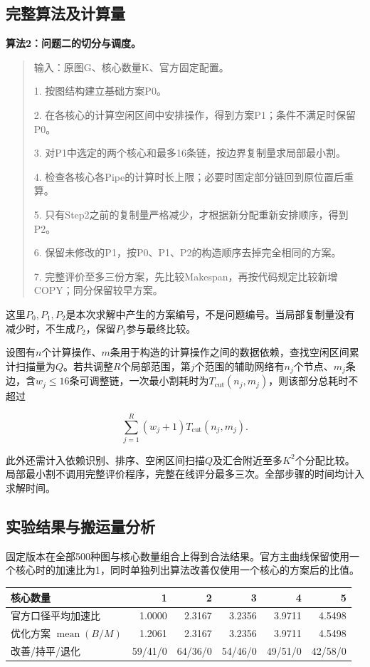 \documentclass[anonymous,notoc]{gmcm2026}
\begin{document}
\subsection{完整算法及计算量}

\textbf{算法2：问题二的切分与调度。}

\begin{quote}
输入：原图G、核心数量K、官方固定配置。

1. 按图结构建立基础方案P0。

2. 在各核心的计算空闲区间中安排操作，得到方案P1；条件不满足时保留P0。

3. 对P1中选定的两个核心和最多16条链，按边界复制量求局部最小割。

4. 检查各核心各Pipe的计算时长上限；必要时固定部分链回到原位置后重算。

5. 只有Step2之前的复制量严格减少，才根据新分配重新安排顺序，得到P2。

6. 保留未修改的P1，按P0、P1、P2的构造顺序去掉完全相同的方案。

7. 完整评价至多三份方案，先比较Makespan，再按代码规定比较新增COPY；同分保留较早方案。
\end{quote}

这里\(P_0,P_1,P_2\)是本次求解中产生的方案编号，不是问题编号。当局部复制量没有减少时，不生成\(P_2\)，保留\(P_1\)参与最终比较。

设图有\(n\)个计算操作、\(m\)条用于构造的计算操作之间的数据依赖，查找空闲区间累计扫描量为\(Q\)。若共调整\(R\)个局部范围，第\(j\)个范围的辅助网络有\(n_j\)个节点、\(m_j\)条边，含\(w_j\le16\)条可调整链，一次最小割耗时为\(T_{\mathrm{cut}}(n_j,m_j)\)，则该部分总耗时不超过

\begin{equation}
\sum_{j=1}^{R}(w_j+1)T_{\mathrm{cut}}(n_j,m_j).
\end{equation}

此外还需计入依赖识别、排序、空闲区间扫描\(Q\)及汇合附近至多\(K^2\)个分配比较。局部最小割不调用完整评价程序，完整在线评分最多三次。全部步骤的时间均计入求解时间。

\subsection{实验结果与搬运量分析}

固定版本在全部500种图与核心数量组合上得到合法结果。官方主曲线保留使用一个核心时的加速比为1，同时单独列出算法改善仅使用一个核心的方案后的比值。

\begin{table}[!htbp]\centering\small
\begin{tabularx}{\linewidth}{@{}Xrrrrr@{}}\toprule
核心数量 & 1 & 2 & 3 & 4 & 5 \\
\midrule
官方口径平均加速比 & 1.0000 & 2.3167 & 3.2356 & 3.9711 & 4.5498 \\
优化方案 $\operatorname{mean}(B/M)$ & 1.2061 & 2.3167 & 3.2356 & 3.9711 & 4.5498 \\
改善/持平/退化 & 59/41/0 & 64/36/0 & 54/46/0 & 49/51/0 & 42/58/0 \\
\bottomrule\end{tabularx}\end{table}
\end{document}
